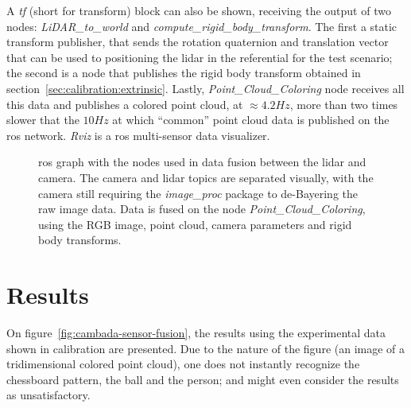 A \emph{tf} (short for transform) block can also be shown, receiving the output of two nodes: \emph{LiDAR\_to\_world} and \emph{compute\_rigid\_body\_transform}. The first a static transform publisher, that sends the rotation quaternion and translation vector that can be used to positioning the \ac{lidar} in the referential for the test scenario; the second is a node that publishes the rigid body transform obtained in section~\ref{sec:calibration:extrinsic}. Lastly, \emph{Point\_Cloud\_Coloring} node receives all this data and publishes a colored point cloud, at $\approx 4.2 Hz$, more than two times slower that the $10 Hz$ at which ``common'' point cloud data is published on the \ac{ros} network. \emph{Rviz} is a \ac{ros} multi-sensor data visualizer.


\begin{figure}[ht]
	\centering
	\def\svgwidth{\columnwidth}
	\graphicspath{{img/sensor_fusion/}}
		
		\caption{\ac{ros} graph with the nodes used in data fusion between the \ac{lidar} and camera. The camera and \ac{lidar} topics are separated visually, with the camera still requiring the \emph{image\_proc} package to de-Bayering the raw image data. Data is fused on the node \emph{Point\_Cloud\_Coloring}, using the RGB image, point cloud, camera parameters and rigid body transforms.}
	\label{fig:sensor-fusion-rosgraph}
\end{figure}


\section{Results}
On figure~\ref{fig:cambada-sensor-fusion}, the results using the experimental data shown in calibration are presented. Due to the nature of the figure (an image of a tridimensional colored point cloud), one does not instantly recognize the chessboard pattern, the ball and the person; and might even consider the results as unsatisfactory. 

